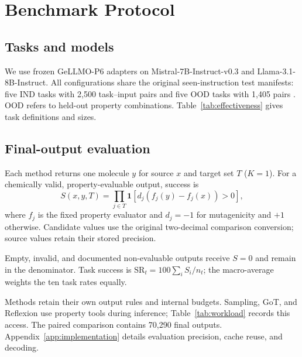 \section{Benchmark Protocol}
\label{sec:protocol}
\subsection{Tasks and models}
We use frozen GeLLMO-P6 adapters on Mistral-7B-Instruct-v0.3 and Llama-3.1-8B-Instruct. All configurations share the original seen-instruction test manifests: five IND tasks with 2,500 task--input pairs and five OOD tasks with 1,405 pairs \citep{gellmo2025}. OOD refers to held-out property combinations. Table~\ref{tab:effectiveness} gives task definitions and sizes.

\subsection{Final-output evaluation}
Each method returns one molecule $y$ for source $x$ and target set $T$ ($K=1$). For a chemically valid, property-evaluable output, success is
\begin{equation}
 S(x,y,T)=\prod_{j\in T}\mathbf{1}\!\left[d_j(f_j(y)-f_j(x))>0\right],
\end{equation}
where $f_j$ is the fixed property evaluator and $d_j=-1$ for mutagenicity and $+1$ otherwise. Candidate values use the original two-decimal comparison conversion; source values retain their stored precision.

Empty, invalid, and documented non-evaluable outputs receive $S=0$ and remain in the denominator. Task success is $\mathrm{SR}_t=100\sum_i S_i/n_t$; the macro-average weights the ten task rates equally.

Methods retain their own output rules and internal budgets. Sampling, GoT, and Reflexion use property tools during inference; Table~\ref{tab:workload} records this access. The paired comparison contains 70,290 final outputs. Appendix~\ref{app:implementation} details evaluation precision, cache reuse, and decoding.
